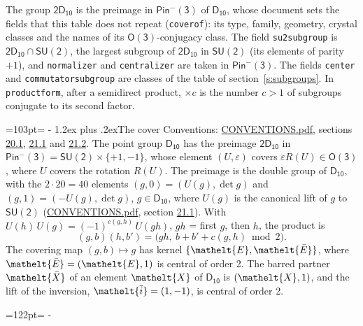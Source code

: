 \documentclass[10pt,a4paper]{article}
\makeatletter
\renewcommand\section{\@startsection{section}{1}{\z@}{-3ex plus -1ex minus -.2ex}%
  {1.2ex plus .2ex}{\normalfont\large\sffamily\bfseries\color{parttitle}}}
\newcommand{\needspace}[1]{\par\penalty-100\begingroup\dimen0=#1\relax\dimen2=\pagegoal
  \advance\dimen2-\pagetotal\ifdim\dimen0>\dimen2\relax\ifdim\dimen2>0pt\vfil\break\fi\fi
  \endgroup}
\numberwithin{equation}{section}
\newcommand{\eltfont}[1]{{\let\sigma\eltsigma\mathelt{#1}}}
\newcommand{\grp}[1]{\mathsf{#1}}
\newcommand{\elt}[1]{\eltfont{#1}}
\newcommand{\dirprod}{\times}
\newcommand{\barred}[1]{\bar{#1}}
\newcommand{\lift}[1]{\tilde{#1}}
\makeatother
\begin{document}
\leavevmode\label{n:element.inversion}\label{n:group.preimage}The group $\grp{2D_{10}}$ is the preimage in $\grp{Pin^{-}(3)}$ of \href{../../../rotation/data/pdf/D10.pdf}{$\grp{D_{10}}$}, whose document sets the fields that this table does not repeat (\texttt{coverof}): its type, family, geometry, crystal classes and the names of its \href{../../../rotation/data/pdf/O3.pdf}{$\grp{O(3)}$}-conjugacy class. The field \texttt{su2subgroup} is $\grp{2D_{10}} \cap \grp{SU(2)}$, the largest subgroup of $\grp{2D_{10}}$ in $\grp{SU(2)}$ (its elements of parity $+1$), and \texttt{normalizer} and \texttt{centralizer} are taken in $\grp{Pin^{-}(3)}$. The fields \texttt{center} and \texttt{commutatorsubgroup} are classes of the table of section~\ref{s:subgroups}.
\leavevmode\label{n:index.conjugates.c}In \texttt{productform}, after a semidirect product, ${\times}c$ is the number $c > 1$ of subgroups conjugate to its second factor.
\needspace{103pt}
\section{The cover}\label{s:cover}
Conventions: \href{../../CONVENTIONS.pdf}{CONVENTIONS.pdf}, sections \href{../../CONVENTIONS.pdf\#conv.20.1}{20.1}, \href{../../CONVENTIONS.pdf\#conv.21.1}{21.1} and \href{../../CONVENTIONS.pdf\#conv.21.2}{21.2}.
\leavevmode\label{n:group.pin.minus}\label{n:group.su2}\label{n:local.pin.sign}\label{n:matrix.covered}\label{n:matrix.lift.su2}\label{n:index.bar}The point group $\grp{D_{10}}$ has the preimage $\grp{2D_{10}}$ in $\grp{Pin^{-}(3)} = \grp{SU(2)} \dirprod \{+1, -1\}$, whose element $(U, \varepsilon)$ covers $\varepsilon R(U) \in \grp{O(3)}$, where $U$ covers the rotation $R(U)$. The preimage is the double group of $\grp{D_{10}}$, with the $2 \cdot 20 = 40$ elements $(g, 0) = (U(g), \det g)$ and $(g, 1) = (-U(g), \det g)$, $g \in \grp{D_{10}}$, where $U(g)$ is the canonical lift of $g$ to $\grp{SU(2)}$ (\href{../../CONVENTIONS.pdf}{CONVENTIONS.pdf}, section \href{../../CONVENTIONS.pdf\#conv.21.1}{21.1}). \label{n:function.cocycle}With $U(h)\,U(g) = (-1)^{c(g,h)}\,U(gh)$, $gh$ = first $g$, then $h$, the product is
\begin{equation}\label{e:product}(g, b)(h, b') = \bigl(gh,\ b + b' + c(g, h) \bmod 2\bigr).\end{equation}
\leavevmode\label{n:mark.bar}The covering map $(g, b) \mapsto g$ has kernel $\{\elt{E}, \elt{\barred{E}}\}$, where $\elt{\barred{E}} = (\elt{E}, 1)$ is central of order 2. \label{n:element.named}\label{n:mark.lift}The barred partner $\elt{\barred{X}}$ of an element $\elt{X}$ of $\grp{D_{10}}$ is $(\elt{X}, 1)$, and the lift of the inversion, $\elt{\lift{i}} = (1, -1)$, is central of order 2.
\needspace{122pt}
\end{document}
